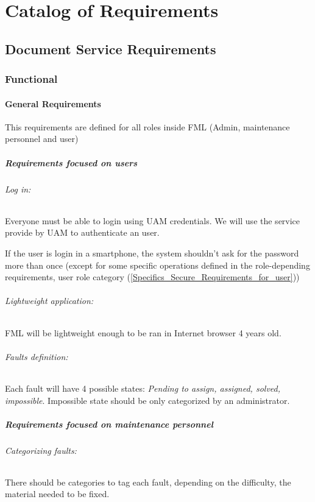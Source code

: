 \documentclass{report}
\begin{document}
\chapter{Catalog of Requirements}

\section{Document Service Requirements}

\subsection{Functional}

\subsubsection{General Requirements}

This requirements are defined for all roles inside FML (Admin, maintenance personnel and user)

\paragraph{Requirements focused on users}


\subparagraph{Log in: } Everyone must be able to login using UAM credentials. We will use the service provide by UAM to authenticate an user.

If the user is login in a smartphone, the system shouldn't ask for the password more than once (except for some specific operations defined in the role-depending requirements, user role category (\ref{Specifics_Secure_Requirements_for_user}))

\subparagraph{Lightweight application: } FML will be lightweight enough to be ran in Internet browser 4 years old.

\subparagraph{Faults definition: } Each fault will have 4 possible states: \textit{Pending to assign, assigned, solved, impossible}. Impossible state should be only categorized by an administrator.

\paragraph{Requirements focused on maintenance personnel}

\subparagraph{Categorizing faults: } There should be categories to tag each fault, depending on the difficulty, the material needed to be fixed.
\end{document}
